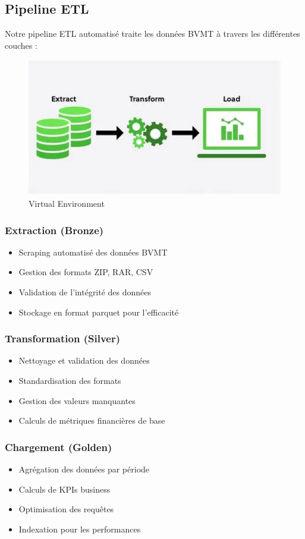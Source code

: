 \subsection{Pipeline ETL}
Notre pipeline ETL automatisé traite les données BVMT à travers les différentes couches :
\begin{figure}[H]
    \centering
    \includegraphics[width=\figwidth]{img/ETL (1).png}
    \caption{Virtual Environment}
    \label{fig:Virtual Environment}
\end{figure}

\subsubsection{Extraction (Bronze)}
\begin{itemize}
    \item Scraping automatisé des données BVMT
    \item Gestion des formats ZIP, RAR, CSV
    \item Validation de l'intégrité des données
    \item Stockage en format parquet pour l'efficacité
\end{itemize}

\subsubsection{Transformation (Silver)}
\begin{itemize}
    \item Nettoyage et validation des données
    \item Standardisation des formats
    \item Gestion des valeurs manquantes
    \item Calculs de métriques financières de base
\end{itemize}

\subsubsection{Chargement (Golden)}
\begin{itemize}
    \item Agrégation des données par période
    \item Calculs de KPIs business
    \item Optimisation des requêtes
    \item Indexation pour les performances
\end{itemize}

